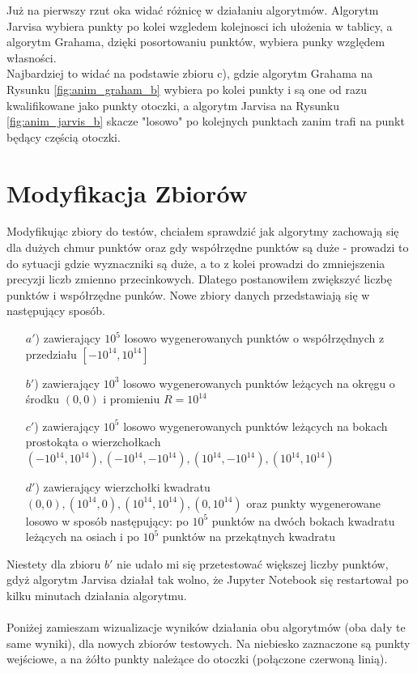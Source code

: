 \documentclass[a4paper]{article}
\begin{document}
Już na pierwszy rzut oka widać różnicę w działaniu algorytmów. Algorytm Jarvisa wybiera punkty 
po kolei wzgledem kolejnosci ich ułożenia w tablicy, a algorytm Grahama, dzięki posortowaniu punktów,
wybiera punky względem własności.\\
Najbardziej to widać na podstawie zbioru c), gdzie algorytm Grahama na Rysunku \ref{fig:anim_graham_b}
wybiera po kolei punkty i są one od razu kwalifikowane jako punkty otoczki, a algorytm Jarvisa na 
Rysunku \ref{fig:anim_jarvis_b} skacze "losowo" po kolejnych punktach zanim trafi na punkt będący 
częścią otoczki.

\section{Modyfikacja Zbiorów}
Modyfikując zbiory do testów, chciałem sprawdzić jak algorytmy zachowają się dla dużych chmur punktów
oraz gdy współrzędne punktów są duże - prowadzi to do sytuacji gdzie wyznaczniki są duże, a to z kolei
prowadzi do zmniejszenia precyzji liczb zmienno przecinkowych. Dlatego postanowiłem zwiększyć liczbę punktów
i współrzędne punków. Nowe zbiory danych przedstawiają się w następujący sposób.

\begin{itemize}
    \item [$a'$)] zawierający $10^5$ losowo wygenerowanych punktów o współrzędnych z przedziału $[-10^{14}, 10^{14}]$
    \item [$b'$)] zawierający $10^3$ losowo wygenerowanych punktów leżących na okręgu o środku $(0,0)$ i promieniu $R=10^{14}$
    \item [$c'$)] zawierający $10^5$ losowo wygenerowanych punktów leżących na bokach prostokąta o wierzchołkach $(-10^{14}, 10^{14}), (-10^{14},-10^{14}), (10^{14},-10^{14}), (10^{14},10^{14})$
    \item [$d'$)] zawierający wierzchołki kwadratu $(0, 0), (10^{14}, 0), (10^{14}, 10^{14}), (0, 10^{14})$ oraz punkty wygenerowane losowo w sposób następujący: 
    po $10^5$ punktów na dwóch bokach kwadratu leżących na osiach i po $10^5$ punktów na przekątnych kwadratu
\end{itemize}
Niestety dla zbioru $b'$ nie udało mi się przetestować większej liczby punktów, gdyż algorytm Jarvisa działał tak wolno, 
że Jupyter Notebook się restartował po kilku minutach działania algorytmu.
\\\\
Poniżej zamieszam wizualizacje wyników działania obu algorytmów (oba dały te same wyniki), dla nowych zbiorów
testowych. Na niebiesko zaznaczone są punkty wejściowe, a na żółto punkty należące do otoczki (połączone czerwoną linią).
\end{document}
